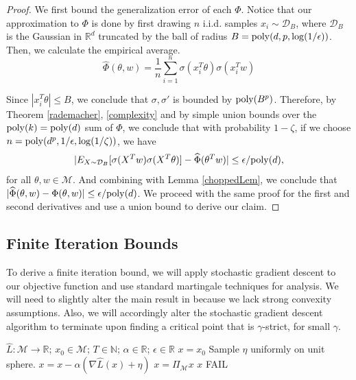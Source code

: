 \documentclass{article}
\newcommand{\N}{{\mathbb{N}}}
\newcommand{\R}{{\mathbb{R}}}
\begin{document}
\begin{proof}
  We first bound the generalization error of each $\Phi$. Notice that
  our approximation to $\Phi$ is done by first drawing $n$
  i.i.d. samples $x_i \sim \mathcal{D}_B$, where $\mathcal{D}_B$ is
  the Gaussian in $\R^d$ truncated by the ball of radius
  $B = \mathrm{poly}(d,p,\log(1/\epsilon))$. Then, we calculate the empirical
  average.
%
\[\widehat{\Phi}(\theta,w) = \frac{1}{n}\sum_{i=1}^n \sigma(x_i^T\theta)\sigma(x_i^Tw) \]

Since $|x_i^T\theta|\leq B$, we conclude that $\sigma, \sigma'$ is bounded by $\mathrm{poly}(B^p)$. Therefore, by Theorem \ref{rademacher}, \ref{complexity} and by simple union bounds over the $\mathrm{poly}(k) = \mathrm{poly}(d)$ sum of $\Phi$, we conclude that with probability $1-\zeta$, if we choose $n = \mathrm{poly}(d^p,1/\epsilon, \log(1/\zeta))$, we have 
%
\[|E_{X\sim \mathcal{D}_B}[\sigma(X^Tw)\sigma(X^T\theta)] -
\widehat{\Phi}(\theta^Tw)| \leq \epsilon/\mathrm{poly}(d),\]
for all $\theta, w \in \mathcal{M}$. And combining with Lemma
\ref{choppedLem}, we conclude that
$|\widehat{\Phi}(\theta,w) - \Phi(\theta,w)|\leq \epsilon/\mathrm{poly}(d)$. We proceed
with the same proof for the first and second derivatives and use a
union bound to derive our claim.
\end{proof}


\subsection{Finite Iteration Bounds} 
To derive a finite iteration bound, we will apply stochastic gradient descent to our objective function and use standard martingale techniques for analysis. We will need to slightly alter the main result in \cite{GeHJY15} because we lack strong convexity assumptions. Also, we will accordingly alter the stochastic gradient descent algorithm to terminate upon finding a critical point that is $\gamma$-strict, for small $\gamma$.
%
\begin{algorithm}[hb]
 \caption{$x = SGD(\widehat{L}, x_0, T,\alpha,\epsilon)$}
   \label{SGD}
\begin{algorithmic}
    $\widehat{L}:\mathcal{M} \to \R$; $x_0 \in \mathcal{M}$; $T\in \N$; $\alpha \in \R$; $\epsilon\in\R$
   \vspace{.1in}
    $x = x_0$
   \STATE Sample $\eta$ uniformly on unit sphere.
   \STATE $x = x - \alpha(\nabla \widehat{L} (x)+\eta)$ 
   \STATE $x = \Pi_\mathcal{M} x$
    $x$
   \ENDIF
   \ENDFOR
    FAIL
\end{algorithmic}
\end{algorithm}
\end{document}
